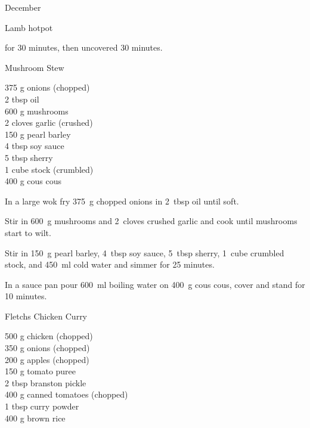 \begin{menu}{December}
\begin{recipe}{2}{Lamb hotpot}
\begin{instructions}
        for 30 minutes,
        then uncovered 30 minutes.
      
    \end{instructions}
    \end{recipe}%
  
    \begin{recipe}{2}{Mushroom Stew}%
    
		\begin{ingredients}
		375 g onions (chopped) \\
	2 tbsp oil  \\
	600 g mushrooms  \\
	2 cloves garlic (crushed) \\
	150 g pearl barley  \\
	4 tbsp soy sauce  \\
	5 tbsp sherry  \\
	1 cube stock (crumbled) \\
	400 g cous cous  \\
	
		\end{ingredients}
	
	
    \begin{instructions}
    \item 
        In a large wok fry
        375~g chopped onions
        in
        2~tbsp  oil
        until soft.
      \item 
        Stir in
        600~g  mushrooms
        and
        2~cloves crushed garlic
        and cook until mushrooms start to wilt.
      \item 
        Stir in
        150~g  pearl barley,
        4~tbsp  soy sauce,
        5~tbsp  sherry,
        1~cube crumbled stock,
        and
        450~ml  cold water
        and simmer for 25 minutes.
      \item 
      In a
      sauce pan pour 600~ml  boiling water
      on 400~g  cous cous, cover and
      stand for 10 minutes.
    
    \end{instructions}
    \end{recipe}%
  
    \begin{recipe}{2}{Fletchs Chicken Curry}%
    
		\begin{ingredients}
		500 g chicken (chopped) \\
	350 g onions (chopped) \\
	200 g apples (chopped) \\
	150 g tomato puree  \\
	2 tbsp branston pickle  \\
	400 g canned tomatoes (chopped) \\
	1 tbsp curry powder  \\
	400 g brown rice  \\
	

\end{ingredients}
\end{recipe}
\end{menu}
